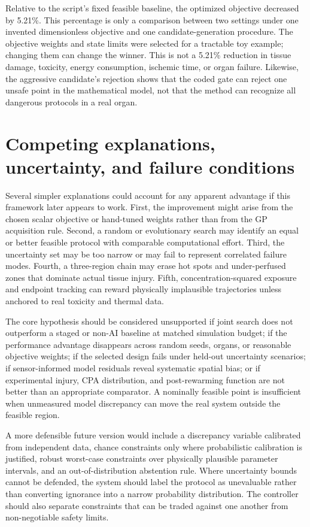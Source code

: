 \documentclass[11pt]{article}
\begin{document}
Relative to the script's fixed feasible baseline, the optimized objective decreased by 5.21\%. This percentage is only a comparison between two settings under one invented dimensionless objective and one candidate-generation procedure. The objective weights and state limits were selected for a tractable toy example; changing them can change the winner. This is not a 5.21\% reduction in tissue damage, toxicity, energy consumption, ischemic time, or organ failure. Likewise, the aggressive candidate's rejection shows that the coded gate can reject one unsafe point in the mathematical model, not that the method can recognize all dangerous protocols in a real organ.

\section{Competing explanations, uncertainty, and failure conditions}

Several simpler explanations could account for any apparent advantage if this framework later appears to work. First, the improvement might arise from the chosen scalar objective or hand-tuned weights rather than from the GP acquisition rule. Second, a random or evolutionary search may identify an equal or better feasible protocol with comparable computational effort. Third, the uncertainty set may be too narrow or may fail to represent correlated failure modes. Fourth, a three-region chain may erase hot spots and under-perfused zones that dominate actual tissue injury. Fifth, concentration-squared exposure and endpoint tracking can reward physically implausible trajectories unless anchored to real toxicity and thermal data.

The core hypothesis should be considered unsupported if joint search does not outperform a staged or non-AI baseline at matched simulation budget; if the performance advantage disappears across random seeds, organs, or reasonable objective weights; if the selected design fails under held-out uncertainty scenarios; if sensor-informed model residuals reveal systematic spatial bias; or if experimental injury, CPA distribution, and post-rewarming function are not better than an appropriate comparator. A nominally feasible point is insufficient when unmeasured model discrepancy can move the real system outside the feasible region.

A more defensible future version would include a discrepancy variable calibrated from independent data, chance constraints only where probabilistic calibration is justified, robust worst-case constraints over physically plausible parameter intervals, and an out-of-distribution abstention rule. Where uncertainty bounds cannot be defended, the system should label the protocol as unevaluable rather than converting ignorance into a narrow probability distribution. The controller should also separate constraints that can be traded against one another from non-negotiable safety limits.
\end{document}
